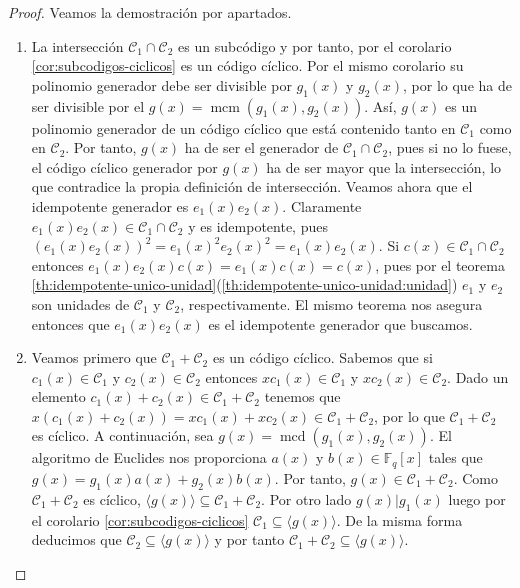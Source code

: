 \begin{proof}
  Veamos la demostración por apartados.
  \begin{enumerate}
    \item La intersección \(\mathcal C_1 \cap \mathcal C_2\) es un subcódigo y por tanto, por el corolario \ref{cor:subcodigos-ciclicos} es un código cíclico.
    Por el mismo corolario su polinomio generador debe ser divisible por \(g_1(x)\) y \(g_2(x)\), por lo que ha de ser divisible por el \(g(x) = \operatorname{mcm}(g_1(x), g_2(x))\).
    Así, \(g(x)\) es un polinomio generador de un código cíclico que está contenido tanto en \(\mathcal C_1\) como en \(\mathcal C_2\).
    Por tanto, \(g(x)\) ha de ser el generador de \(\mathcal C_1 \cap \mathcal C_2\), pues si no lo fuese, el código cíclico generador por \(g(x)\) ha de ser mayor que la intersección, lo que contradice la propia definición de intersección.
    Veamos ahora que el idempotente generador es \(e_1(x)e_2(x)\).
    Claramente \(e_1(x)e_2(x) \in \mathcal C_1 \cap \mathcal C_2\) y es idempotente, pues \((e_1(x)e_2(x))^2 = e_1(x)^2e_2(x)^2 = e_1(x)e_2(x)\).
    Si \(c(x) \in \mathcal C_1 \cap \mathcal C_2\) entonces \(e_1(x)e_2(x)c(x) = e_1(x)c(x) = c(x)\), pues por el teorema \ref{th:idempotente-unico-unidad}(\ref{th:idempotente-unico-unidad:unidad}) \(e_1\) y \(e_2\) son unidades de \(\mathcal C_1\) y \(\mathcal C_2\), respectivamente.
    El mismo teorema nos asegura entonces que \(e_1(x)e_2(x)\) es el idempotente generador que buscamos.
    \item Veamos primero que \(\mathcal C_1 + \mathcal C_2\) es un código cíclico.
    Sabemos que si \(c_1(x) \in \mathcal C_1\) y \(c_2(x) \in \mathcal C_2\) entonces \(xc_1(x) \in \mathcal C_1\) y \(xc_2(x) \in \mathcal C_2\).
    Dado un elemento \(c_1(x) + c_2(x) \in \mathcal C_1 + \mathcal C_2\) tenemos que \(x(c_1(x) + c_2(x)) = xc_1(x) + xc_2(x) \in \mathcal C_1 + \mathcal C_2\), por lo que \(\mathcal C_1 + \mathcal C_2\) es cíclico.
    A continuación, sea \(g(x) = \operatorname{mcd}(g_1(x), g_2(x))\).
    El algoritmo de Euclides nos proporciona \(a(x)\) y \(b(x) \in \mathbb F_q[x]\) tales que \(g(x) = g_1(x)a(x) + g_2(x)b(x)\).
    Por tanto, \(g(x) \in \mathcal C_1 + \mathcal C_2\).
    Como \(\mathcal C_1 + \mathcal C_2\) es cíclico, \(\langle g(x) \rangle \subseteq \mathcal C_1 + \mathcal C_2\).
    Por otro lado \(g(x) | g_1(x)\) luego por el corolario \ref{cor:subcodigos-ciclicos} \(\mathcal C_1 \subseteq \langle g(x) \rangle\).
    De la misma forma deducimos que \(\mathcal C_2 \subseteq \langle g(x) \rangle\) y por tanto \(\mathcal C_1 + \mathcal C_2 \subseteq \langle g(x) \rangle\).

\end{enumerate}
\end{proof}
